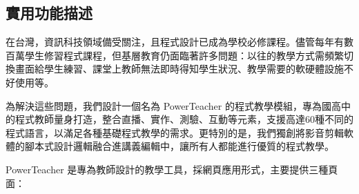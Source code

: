 \documentclass[12pt]{article}
\begin{document}
\subsection{實用功能描述}
  \par 在台灣，資訊科技領域備受關注，且程式設計已成為學校必修課程。儘管每年有數百萬學生修習程式課程，但基層教育仍面臨著許多問題：以往的教學方式需頻繁切換畫面給學生練習、課堂上教師無法即時得知學生狀況、教學需要的軟硬體設施不好使用等。\\
  \par 為解決這些問題，我們設計一個名為 PowerTeacher 的程式教學模組，專為國高中的程式教師量身打造，整合直播、實作、測驗、互動等元素，支援高達60種不同的程式語言，以滿足各種基礎程式教學的需求。更特別的是，我們獨創將影音剪輯軟體的腳本式設計邏輯融合進講義編輯中，讓所有人都能進行優質的程式教學。\\
  \par PowerTeacher 是專為教師設計的教學工具，採網頁應用形式，主要提供三種頁面：
\end{document}
